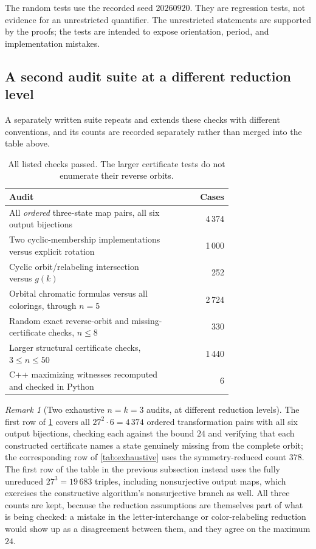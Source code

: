 \documentclass[11pt,a4paper]{article}
\numberwithin{equation}{section}
\theoremstyle{definition}
\theoremstyle{remark}
\newtheorem{remark}[theorem]{Remark}
\begin{document}
The random tests use the recorded seed $20260920$. They are regression tests,
not evidence for an unrestricted quantifier. The unrestricted statements are
supported by the proofs; the tests are intended to expose orientation,
period, and implementation mistakes.

\subsection{A second audit suite at a different reduction level}

A separately written suite repeats and extends these checks with different
conventions, and its counts are recorded separately rather than merged into
the table above.

\begin{table}[htbp]
\centering
\begin{tabular}{@{}p{0.73\linewidth}r@{}}
\toprule
Audit & Cases\\
\midrule
All \emph{ordered} three-state map pairs, all six output bijections & 4\,374\\
Two cyclic-membership implementations versus explicit rotation & 1\,000\\
Cyclic orbit/relabeling intersection versus $g(k)$ & 252\\
Orbital chromatic formulas versus all colorings, through $n=5$ & 2\,724\\
Random exact reverse-orbit and missing-certificate checks, $n\le8$ & 330\\
Larger structural certificate checks, $3\le n\le50$ & 1\,440\\
C++ maximizing witnesses recomputed and checked in Python & 6\\
\bottomrule
\end{tabular}
\caption{All listed checks passed. The larger certificate tests do not
enumerate their reverse orbits.}
\label{tab:audits}
\end{table}

\begin{remark}[Two exhaustive $n=k=3$ audits, at different reduction
levels]\label{rem:tworeductions}
The first row of \cref{tab:audits} covers all $27^2\cdot6=4\,374$ ordered
transformation pairs with all six output bijections, checking each against
the bound $24$ and verifying that each constructed certificate names a state
genuinely missing from the complete orbit; the corresponding row of
\cref{tab:exhaustive} uses the symmetry-reduced count $378$. The first row of
the table in the previous subsection instead uses the fully unreduced
$27^3=19\,683$ triples, including nonsurjective output maps, which exercises
the constructive algorithm's nonsurjective branch as well. All three counts
are kept, because the reduction assumptions are themselves part of what is
being checked: a mistake in the letter-interchange or color-relabeling
reduction would show up as a disagreement between them, and they agree on the
maximum $24$.
\end{remark}
\end{document}
